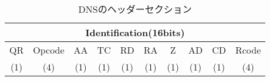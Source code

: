 \begin{table}[htb]
 \caption{DNSのヘッダーセクション}
 \centering
  \begin{tabular}{|c|c|c|c|c|c|c|c|c|c|}
    \toprule
		\multicolumn{10}{|c|}{Identification(16bits)}\\
    \midrule
		QR & Opcode & AA & TC & RD & RA & Z & AD & CD & Rcode \\
		(1) & (4) & (1) & (1) & (1) & (1) & (1) & (1) & (1) & (4) \\
    \bottomrule
  \end{tabular}
 \label{tab:header-dns}
\end{table}
